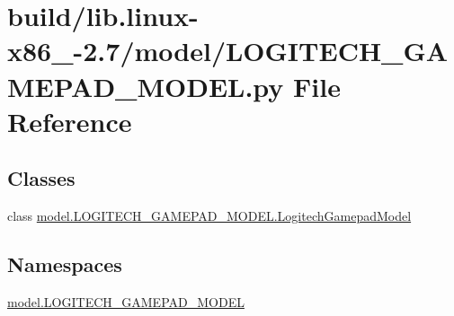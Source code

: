 \hypertarget{build_2lib_8linux-x86__64-2_87_2model_2LOGITECH__GAMEPAD__MODEL_8py}{}\section{build/lib.linux-\/x86\+\_-\/2.7/model/\+L\+O\+G\+I\+T\+E\+C\+H\+\_\+\+G\+A\+M\+E\+P\+A\+D\+\_\+\+M\+O\+D\+E\+L.py File Reference}
\label{build_2lib_8linux-x86__64-2_87_2model_2LOGITECH__GAMEPAD__MODEL_8py}
\subsection*{Classes}
\begin{DoxyCompactItemize}
\item 
class \hyperlink{classmodel_1_1LOGITECH__GAMEPAD__MODEL_1_1LogitechGamepadModel}{model.\+L\+O\+G\+I\+T\+E\+C\+H\+\_\+\+G\+A\+M\+E\+P\+A\+D\+\_\+\+M\+O\+D\+E\+L.\+Logitech\+Gamepad\+Model}
\end{DoxyCompactItemize}
\subsection*{Namespaces}
\begin{DoxyCompactItemize}
\item 
 \hyperlink{namespacemodel_1_1LOGITECH__GAMEPAD__MODEL}{model.\+L\+O\+G\+I\+T\+E\+C\+H\+\_\+\+G\+A\+M\+E\+P\+A\+D\+\_\+\+M\+O\+D\+E\+L}
\end{DoxyCompactItemize}
